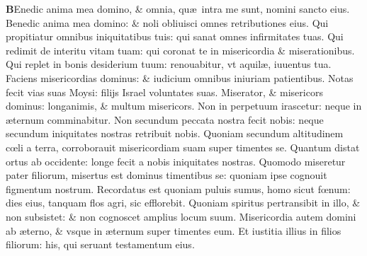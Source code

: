 \documentclass[a5paper,10pt]{book}
\def\ae{æ}
\def\oe{œ}
\begin{document}
\begin{multicols*}{2}
\lettrine[lines=2]{\bfseries \color{red} B}{}Enedic anima mea domino, \& omnia, qu\ae \ intra me sunt, nomini sancto eius.
\newline \color{red} B\color{black}enedic anima mea domino: \& noli obliuisci omnes retributiones eius.
\newline \color{red} Q\color{black}ui propitiatur omnibus iniquitatibus tuis: qui sanat omnes infirmitates tuas.
\newline \color{red} Q\color{black}ui redimit de interitu vitam tuam: qui coronat te in misericordia \& miserationibus.
\newline \color{red} Q\color{black}ui replet in bonis desiderium tuum: renouabitur, vt aquil\ae , iuuentus tua.
\newline \color{red} F\color{black}aciens misericordias dominus: \& iudicium omnibus iniuriam patientibus.
\newline \color{red} N\color{black}otas fecit vias suas Moysi: filijs Israel voluntates suas.
\newline \color{red} M\color{black}iserator, \& misericors dominus: longanimis, \& multum misericors.
\newline \color{red} N\color{black}on in perpetuum irascetur: neque in \ae ternum comminabitur.
\newline \color{red} N\color{black}on secundum peccata nostra fecit nobis: neque secundum iniquitates nostras retribuit nobis.
\newline \color{red} Q\color{black}uoniam secundum altitudinem c\oe li a terra, corroborauit misericordiam suam super timentes se.
\newline \color{red} Q\color{black}uantum distat ortus ab occidente: longe fecit a nobis iniquitates nostras.
\newline \color{red} Q\color{black}uomodo miseretur pater filiorum, misertus est dominus timentibus se: quoniam ipse cognouit figmentum nostrum.
\newline \color{red} R\color{black}ecordatus est quoniam puluis sumus, homo sicut f\oe num: dies eius, tanquam flos agri, sic efflorebit.
\newline \color{red} Q\color{black}uoniam spiritus pertransibit in illo, \& non subsistet: \& non cognoscet amplius locum suum.
\newline \color{red} M\color{black}isericordia autem domini ab \ae terno, \& vsque in \ae ternum super timentes eum.
\newline \color{red} E\color{black}t iustitia illius in filios filiorum: his, qui seruant testamentum eius.

\end{multicols*}
\end{document}
